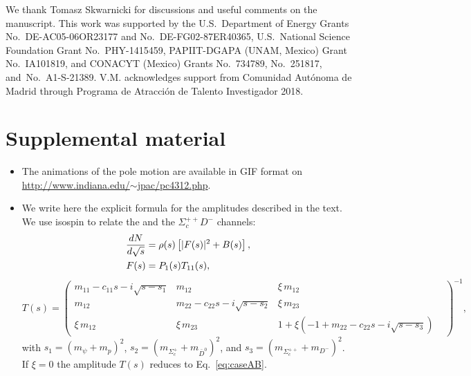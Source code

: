 \documentclass[aps,prl,
twocolumn,nofootinbib,
superscriptaddress,preprintnumbers]{revtex4-1}
\begin{document}
   
We thank Tomasz Skwarnicki for discussions  and useful comments on the manuscript.
This work was supported by
the U.S.~Department of Energy Grants
No.~DE-AC05-06OR23177 %
and No.~DE-FG02-87ER40365, %
U.S.~National Science Foundation Grant No.~PHY-1415459, %
PAPIIT-DGAPA (UNAM, Mexico) Grant No.~IA101819, %
and CONACYT (Mexico) Grants No.~734789, No.~251817,
and~No.~A1-S-21389. %
V.M. acknowledges support from Comunidad Aut\'onoma de Madrid through 
Programa de Atracci\'on de Talento Investigador 2018.





\clearpage
\onecolumngrid
\section{Supplemental material}
\begin{itemize}
\item The animations of the pole motion are available in GIF format on \href{http://www.indiana.edu/~jpac/pc4312.php}{http://www.indiana.edu/$\sim$jpac/pc4312.php}.
\item We write here the explicit formula for the amplitudes described in the text. We use isospin to relate the \SigmaD and the $\Sigma_c^{++} D^-$ channels: 
\begin{align*}
\frac{dN}{d\sqrt{s}} & = \rho(s) \left[ |F(s)|^2   
 + B(s) \right],\\
F(s) &= P_1(s) T_{11} (s),
\end{align*}%
\begin{equation*}
T(s) = \begin{pmatrix}
m_{11} - c_{11} s - i \sqrt{s - s_1} & m_{12} & \xi\, m_{12}\\ 
m_{12} & m_{22} - c_{22} s - i \sqrt{s - s_2} & \xi\, m_{23} & \\
\xi \, m_{12} & \xi \, m_{23} & 1 + \xi \left(-1 + m_{22} - c_{22} s - i \sqrt{s - s_3}\right)\end{pmatrix}^{-1},
\end{equation*}
with $s_1 = \left(m_{\psi} + m_{p}\right)^2$, $s_2 = \left(m_{\Sigma_c^{+}} + m_{\bar D^0}\right)^2$, and $s_3 = \left(m_{\Sigma_c^{++}} + m_{D^-}\right)^2$.
If $\xi=0$ the amplitude $T(s)$ reduces to Eq.~\eqref{eq:caseAB}.
\end{itemize}
\end{document}
